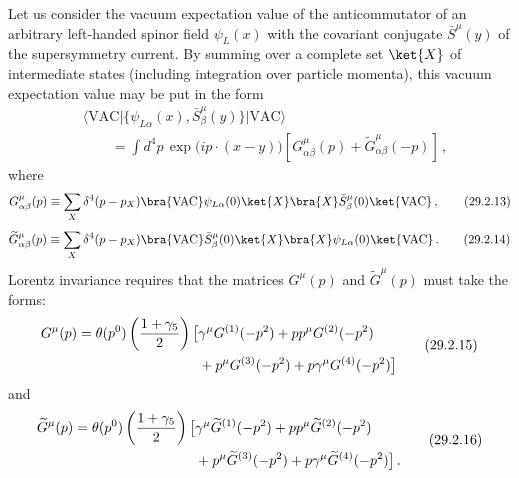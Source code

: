 Let us consider the vacuum expectation value of the anticommutator of an
arbitrary left-handed spinor field \(\psi_L(x)\) with the covariant
conjugate \(\bar S^\mu(y)\) of the supersymmetry current. By summing over
a complete set \(\ket{X}\) of intermediate states (including
integration over particle momenta), this vacuum expectation value may be
put in the form
\begin{equation}
  \begin{aligned}
  &\langle\mathrm{VAC}\lvert
    \{\psi_{L\alpha}(x),\bar S^\mu_\beta(y)\}
    \rvert\mathrm{VAC}\rangle
  \\
  &\qquad
  =\int d^4p\,\exp\bigl(ip\mathbin{\cdot}(x-y)\bigr)
    \left[G^\mu_{\alpha\beta}(p)
    +\widetilde G^\mu_{\alpha\beta}(-p)\right]\,,
  \end{aligned}
  \tag{29.2.12}\label{eq:29.2.12}
\end{equation}
where
\begin{equation}
  G^\mu_{\alpha\beta}(p)
  \equiv
  \sum_X\delta^4(p-p_X)
  \bra{\mathrm{VAC}}\psi_{L\alpha}(0)\ket{X}
  \bra{X}\bar S^\mu_\beta(0)\ket{\mathrm{VAC}}\,,
  \tag{29.2.13}\label{eq:29.2.13}
\end{equation}
\begin{equation}
  \widetilde G^\mu_{\alpha\beta}(p)
  \equiv
  \sum_X\delta^4(p-p_X)
  \bra{\mathrm{VAC}}\bar S^\mu_\beta(0)\ket{X}
  \bra{X}\psi_{L\alpha}(0)\ket{\mathrm{VAC}}\,.
  \tag{29.2.14}\label{eq:29.2.14}
\end{equation}
Lorentz invariance requires that the matrices \(G^\mu(p)\) and
\(\widetilde G^\mu(p)\) must take the forms:
\begin{equation}
  \begin{aligned}
  G^\mu(p)
  =\theta(p^0)\left(\frac{1+\gamma_5}{2}\right)
  \bigl[
    &\gamma^\mu G^{(1)}(-p^2)
    +\sl{p}p^\mu G^{(2)}(-p^2)
  \\
    &+p^\mu G^{(3)}(-p^2)
    +\sl{p}\gamma^\mu G^{(4)}(-p^2)
  \bigr]
  \end{aligned}
  \tag{29.2.15}\label{eq:29.2.15}
\end{equation}
and
\begin{equation}
  \begin{aligned}
  \widetilde G^\mu(p)
  =\theta(p^0)\left(\frac{1+\gamma_5}{2}\right)
  \bigl[
    &\gamma^\mu\widetilde G^{(1)}(-p^2)
    +\sl{p}p^\mu\widetilde G^{(2)}(-p^2)
  \\
    &+p^\mu\widetilde G^{(3)}(-p^2)
    +\sl{p}\gamma^\mu\widetilde G^{(4)}(-p^2)
  \bigr]\,.
  \end{aligned}
  \tag{29.2.16}\label{eq:29.2.16}
\end{equation}
